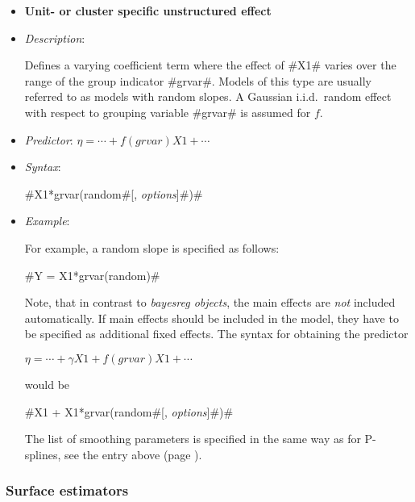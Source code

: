 \begin{itemize}
\item[]{\bf\sffamily Unit- or cluster specific unstructured
effect}

\item[] {\em Description}:

Defines a varying coefficient term where the effect of #X1# varies
over the range of the group indicator #grvar#. Models of this type
are usually referred to as models with random slopes. A Gaussian
i.i.d.~random effect with respect to grouping variable #grvar# is
assumed for $f$.
\item[] {\em Predictor}: $\eta = \cdots + f(grvar)X1 + \cdots$
\item[] {\em Syntax}:

#X1*grvar(random#[, {\em options}]#)#
\item[] {\em Example}:

For example, a random slope is specified as follows:

#Y = X1*grvar(random)#

Note, that in contrast to {\em bayesreg objects}, the main effects
are {\em not} included automatically. If main effects should be
included in the model, they have to be specified as additional
fixed effects. The syntax for obtaining the predictor

$\eta = \cdots + \gamma X1 + f(grvar)X1 + \cdots$

would be

#X1 + X1*grvar(random#[, {\em options}]#)#

The list of smoothing parameters is specified in the same way as for P-splines, see the entry above (page \pageref{psplines_stepwise}).
\end{itemize}

\subsubsection*{Surface estimators}


